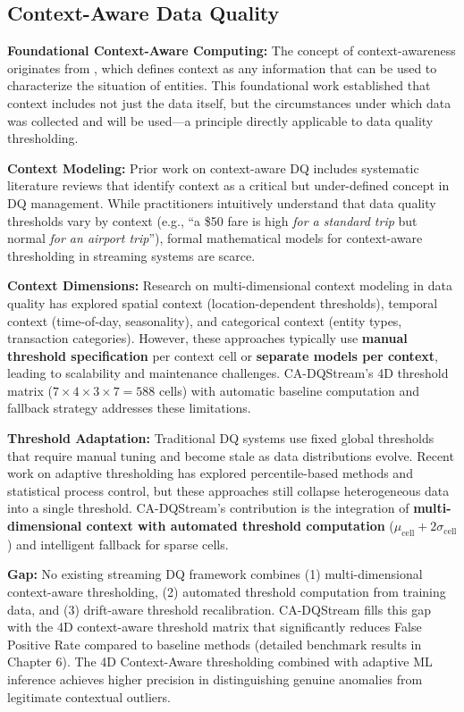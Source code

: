 \subsection{Context-Aware Data Quality}

\textbf{Foundational Context-Aware Computing:} The concept of context-awareness originates from \citep{dey2001understanding}, which defines context as any information that can be used to characterize the situation of entities. This foundational work established that context includes not just the data itself, but the circumstances under which data was collected and will be used---a principle directly applicable to data quality thresholding.

\textbf{Context Modeling:} Prior work on context-aware DQ includes systematic literature reviews \citep{contextdq2022} that identify context as a critical but under-defined concept in DQ management. While practitioners intuitively understand that data quality thresholds vary by context (e.g., ``a \$50 fare is high \emph{for a standard trip} but normal \emph{for an airport trip}''), formal mathematical models for context-aware thresholding in streaming systems are scarce.

\textbf{Context Dimensions:} Research on multi-dimensional context modeling in data quality has explored spatial context (location-dependent thresholds), temporal context (time-of-day, seasonality), and categorical context (entity types, transaction categories). However, these approaches typically use \textbf{manual threshold specification} per context cell or \textbf{separate models per context}, leading to scalability and maintenance challenges. CA-DQStream's 4D threshold matrix ($7 \times 4 \times 3 \times 7 = 588$ cells) with automatic baseline computation and fallback strategy addresses these limitations.

\textbf{Threshold Adaptation:} Traditional DQ systems use fixed global thresholds that require manual tuning and become stale as data distributions evolve. Recent work on adaptive thresholding has explored percentile-based methods and statistical process control, but these approaches still collapse heterogeneous data into a single threshold. CA-DQStream's contribution is the integration of \textbf{multi-dimensional context with automated threshold computation} ($\mu_{\text{cell}} + 2\sigma_{\text{cell}}$) and intelligent fallback for sparse cells.

\textbf{Gap:} No existing streaming DQ framework combines (1) multi-dimensional context-aware thresholding, (2) automated threshold computation from training data, and (3) drift-aware threshold recalibration. CA-DQStream fills this gap with the 4D context-aware threshold matrix that significantly reduces False Positive Rate compared to baseline methods (detailed benchmark results in Chapter 6). The 4D Context-Aware thresholding combined with adaptive ML inference achieves higher precision in distinguishing genuine anomalies from legitimate contextual outliers.


